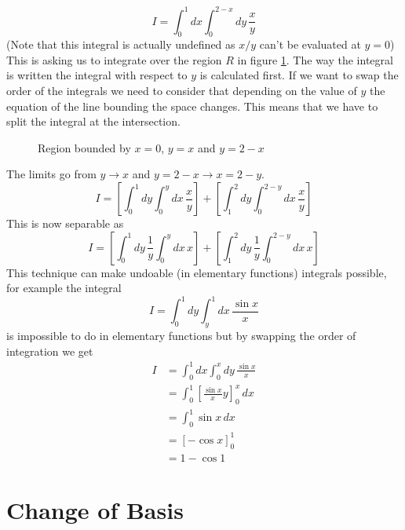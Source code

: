 \documentclass{article}
\begin{document}
    \example
    \[I = \int_0^1 dx\int_0^{2 - x}dy\,\frac{x}{y}\]
    (Note that this integral is actually undefined as \(x/y\) can't be evaluated at \(y = 0\))
    This is asking us to integrate over the region \(R\) in figure \ref{fig:region of integration}.
    The way the integral is written the integral with respect to \(y\) is calculated first.
    If we want to swap the order of the integrals we need to consider that depending on the value of \(y\) the equation of the line bounding the space changes.
    This means that we have to split the integral at the intersection.
    \begin{figure}[ht]
        \centering
        \caption{Region bounded by \(x = 0\), \(y = x\) and \(y = 2 - x\)}
        \label{fig:region of integration}
    \end{figure}
    The limits go from \(y\to x\) and \(y = 2 - x\to x = 2 - y\).
    \[I = \left[\int_0^1dy\int_0^ydx\,\frac{x}{y}\right] + \left[\int_1^2dy\int_0^{2 - y}dx\,\frac{x}{y}\right]\]
    This is now separable as
    \[I = \left[\int_0^1 dy\,\frac{1}{y}\int_0^ydx\,x\right] + \left[\int_1^2 dy\,\frac{1}{y}\int_0^{2-y}dx\, x\right]\]
    This technique can make undoable (in elementary functions) integrals possible, for example the integral
    \[I = \int_0^1 dy\int_y^1 dx\,\frac{\sin x}{x}\]
    is impossible to do in elementary functions but by swapping the order of integration we get
    \begin{align*}
        I &= \int_0^1 dx\int_0^x dy\,\frac{\sin x}{x}\\
        &= \int_0^1 \left[\frac{\sin x}{x}y\right]_0^x\,dx\\
        &= \int_0^1 \sin x\,dx\\
        &= [-\cos x]_0^1\\
        &= 1 - \cos 1
    \end{align*}
    
    \section{Change of Basis}
\end{document}
